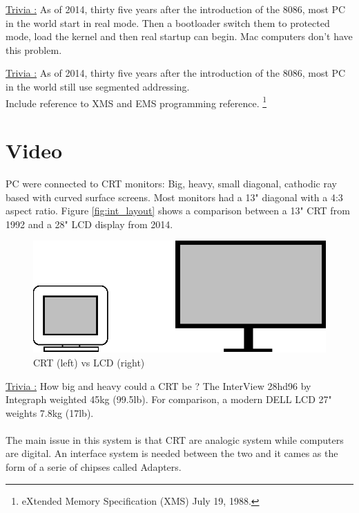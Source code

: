 \documentclass[book.tex]{subfiles}
\begin{document}
{\underline{Trivia :}}  As of 2014, thirty five years after the introduction of the 8086, most PC in the world start in  real mode. Then a bootloader switch them to protected mode, load the kernel and then real startup can begin. Mac computers don't have this problem.

\bigskip

{\underline{Trivia :}}  As of 2014, thirty five years after the introduction of the 8086, most PC in the world still use segmented addressing.\\

Include reference to XMS and EMS programming reference. \footnote{eXtended Memory Specification (XMS) July 19, 1988.}


\section{Video}

PC were connected to CRT monitors: Big, heavy, small diagonal, cathodic ray based with curved surface screens. Most monitors had a 13" diagonal with a 4:3 aspect ratio. Figure \ref{fig:int_layout} shows a comparison between a 13" CRT from 1992 and a 28" LCD display from 2014.\\

\begin{figure}[H]
\centering
\includegraphics[scale=1.2]{imgs/crt_lcd.eps}
\caption{CRT (left) vs LCD (right)}
\label{fig:lcd_vs_crt}
\end{figure}

{\underline{Trivia :}} How big and heavy could a CRT be ? The InterView 28hd96 by Integraph weighted 45kg (99.5lb). For comparison, a modern DELL LCD 27" weights 7.8kg (17lb).\\
\\
The main issue in this system is that CRT are analogic system while computers are digital. An interface system is needed between the two and it cames as the form of a serie of chipses called Adapters.
\end{document}
